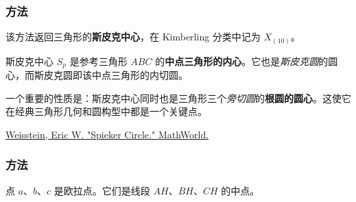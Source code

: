 \subsubsection{方法 }
\label{ssub:method_triangle_spieker_center}

该方法返回三角形的\textbf{斯皮克中心}，在 Kimberling 分类中记为 $X_{(10)}$。

\medskip

斯皮克中心 $S_p$ 是参考三角形 $ABC$ 的\textbf{中点三角形的内心}。它也是\emph{斯皮克圆}的圆心，而斯皮克圆即该中点三角形的内切圆。

\medskip

一个重要的性质是：斯皮克中心同时也是三角形三个\emph{旁切圆}的\textbf{根圆的圆心}。这使它在经典三角形几何和圆构型中都是一个关键点。
\begin{flushright}
\small
\href{https://mathworld.wolfram.com/SpiekerCircle.html}{Weisstein, Eric W. "Spieker Circle." MathWorld.}
\end{flushright}

\vspace{1em}

\begin{tkzexample}[latex=.5\textwidth]
\end{tkzexample}

\subsubsection{方法 } %
\label{ssub:method_triangle_euler__points}

点 $a$、$b$、$c$ 是欧拉点。它们是线段 $AH$、$BH$、$CH$ 的中点。

